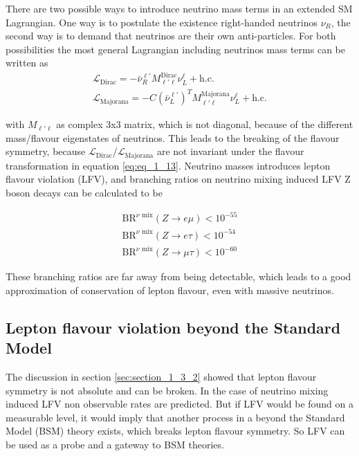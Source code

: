 There are two possible ways to introduce neutrino mass terms in an extended \gls{SM} Lagrangian. One way is to postulate the existence right-handed neutrinos $\nu_R$, the second way is to demand that neutrinos are their own anti-particles. For both possibilities the most general Lagrangian including neutrinos mass terms can be written as
\begin{equation}
	\label{eq:eq_1_15}
	\begin{split}
		\mathcal{L}_{\text{Dirac}} = -\bar{\nu}^{\ell'}_{R}M^{\text{Dirac}}_{\ell'\ell} \nu^{\ell}_{L} + \text{h.c.} \\
		\mathcal{L}_{\text{Majorana}} = -C(\bar{\nu}^{\ell'}_{L})^{T}M^{\text{Majorana}}_{\ell'\ell} \nu^{\ell}_{L} + \text{h.c.} 
	\end{split}
\end{equation}

with $M_{\ell'\ell}$ as complex 3x3 matrix, which is not diagonal, because of the different mass/flavour eigenstates of neutrinos. This leads to the breaking of the flavour symmetry, because $\mathcal{L}_{\text{Dirac}}$/$\mathcal{L}_{\text{Majorana}}$ are not invariant under the flavour transformation in equation \ref{eq:eq_1_13}. Neutrino masses introduces lepton flavour violation (\gls{LFV}), and branching ratios on neutrino mixing induced \gls{LFV} Z boson decays \cite{NEUTRINOLFV} can be calculated to be 

\begin{equation}
	\label{eq:eq_1_16}
	\begin{split}
		\text{BR}^{\nu \text{ mix}}(Z\to e\mu) < 10^{-55} \\
		\text{BR}^{\nu \text{ mix}}(Z\to e\tau) < 10^{-54} \\
		\text{BR}^{\nu \text{ mix}}(Z\to \mu\tau) < 10^{-60}
	\end{split}
\end{equation}

These branching ratios are far away from being detectable, which leads to a good approximation of conservation of lepton flavour, even with massive neutrinos.

\subsection{Lepton flavour violation beyond the Standard Model}
\label{sec:section_1_3_3}

The discussion in section \ref{sec:section_1_3_2} showed that lepton flavour symmetry is not absolute and can be broken. In the case of neutrino mixing induced \gls{LFV} non observable rates are predicted. But if \gls{LFV} would be found on a measurable level, it would imply that another process in a beyond the Standard Model (\gls{BSM}) theory exists, which breaks lepton flavour symmetry. So \gls{LFV} can be used as a probe and a gateway to \gls{BSM} theories. \\

